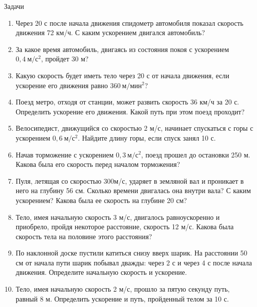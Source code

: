 \documentclass[a5paper, 10pt]{diss_4}
\renewcommand{\'}{\,'}
\begin{document}
\begin{center}
   Задачи
\end{center}
\begin{enumerate}
\item Через 20 с после начала движения спидометр автомобиля показал скорость движения 72 км/ч. С каким ускорением двигался автомобиль?
\item За какое время автомобиль, двигаясь из состояния покоя с ускорением $0,4\ м/с^2$, пройдет 30 м?
\item Какую скорость будет иметь тело через 20 с от начала движения, если ускорение его движения равно $360\ м/мин^2$?
\item Поезд метро, отходя от станции, может развить скорость 36 км/ч за 20 с. Определить ускорение его движения. Какой путь при этом поезд проходит?
\item Велосипедист, движущийся со скоростью 2 м/с, начинает спускаться с горы с ускорением $0,6\ м/с^2$. Найдите длину горы, если спуск занял 10 с.
\item Начав торможение с ускорением $0,3\ м/с^2$, поезд прошел до остановки 250 м. Какова была его скорость перед началом торможения?
\item Пуля, летящая со скоростью 300м/с, ударяет в земляной вал и проникает в него на глубину 56 см. Сколько времени двигалась она внутри вала? С каким ускорением? Какова была ее скорость на глубине 20 см?
\item Тело, имея начальную скорость 3 м/с, двигалось равноускоренно и приобрело, пройдя некоторое расстояние, скорость 12 м/с. Какова была скорость тела на половине этого расстояния?
\item По наклонной доске пустили катиться снизу вверх шарик. На расстоянии 50 см от начала пути шарик побывал дважды: через 2 с и через 4 с после начала движения. Определите начальную скорость и ускорение.
\item Тело, имея начальную скорость 2 м/с, прошло за пятую секунду путь, равный 8 м. Определить ускорение и путь, пройденный телом за 10 с.
\end{enumerate}
\end{document}
